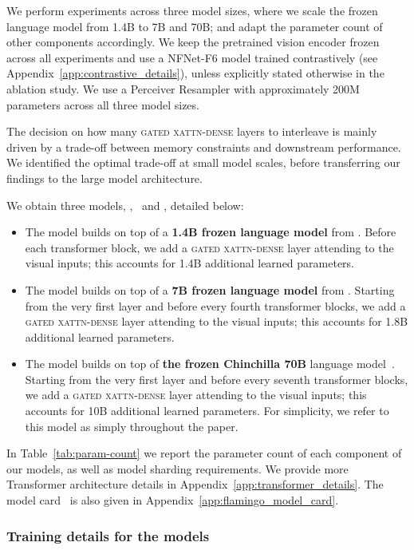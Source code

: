 We perform experiments across three model sizes, where we scale the frozen language model from 1.4B to 7B and 70B; and adapt the parameter count of other components accordingly. 
We keep the pretrained vision encoder frozen across all experiments and use a NFNet-F6 model trained contrastively (see Appendix~\ref{app:contrastive_details}), unless explicitly stated otherwise in the ablation study.
We use a Perceiver Resampler with approximately 200M parameters across all three model sizes.

The decision on how many \textsc{gated xattn-dense} layers to interleave is mainly driven by a trade-off between memory constraints and downstream performance. 
We identified the optimal trade-off at small model scales, before transferring our findings to the large model architecture.

We obtain three models, \base{}, \medium{}~and \largemfull{}, detailed below:
\begin{itemize}
    \item The \base{} model builds on top of a \textbf{1.4B frozen language model} from \cite{chinchilla}. Before each transformer block, we add a \textsc{gated xattn-dense} layer attending to the visual inputs; this accounts for 1.4B additional learned parameters.
    \item The \medium{} model builds on top of a \textbf{7B frozen language model} from \cite{chinchilla}. 
    Starting from the very first layer and before every fourth transformer blocks, we add a \textsc{gated xattn-dense} layer attending to the visual inputs; this accounts for 1.8B additional learned parameters.
    \item The \largemfull{} model builds on top of \textbf{the frozen Chinchilla 70B} language model~\citep{chinchilla}. 
    Starting from the very first layer and before every seventh transformer blocks, we add a \textsc{gated xattn-dense} layer attending to the visual inputs; this accounts for 10B additional learned parameters.
    For simplicity, we refer to this model as simply \largem{} throughout the paper.
\end{itemize}
In Table~\ref{tab:param-count} we report the parameter count of each component of our models, as well as model sharding requirements.
We provide more Transformer architecture details in Appendix~\ref{app:transformer_details}.
The \largem{} model card~\citep{mitchell2019model} is also given in Appendix~\ref{app:flamingo_model_card}.


\subsubsection{Training details for the \method{} models}
\label{app:large_scale_training}


